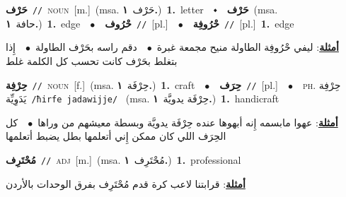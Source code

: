 \documentclass[10pt,a4paper,twoside]{article} %
\begin{document}
\begin{multicols}{2}
{\setlength\topsep{0pt}\textbf{\foreignlanguage{arabic}{حَرْف}}\ {\color{gray}\texttt{//}\color{black}}\ \textsc{noun}\ [m.]\ \color{gray}(msa. \foreignlanguage{arabic}{حَرْف}~\foreignlanguage{arabic}{\textbf{١.}})\color{black}\ \textbf{1.}~letter\ \ $\smblkdiamond$\ \ \setlength\topsep{0pt}\textbf{\foreignlanguage{arabic}{حَرْف}}\ \color{gray}(msa. \foreignlanguage{arabic}{حافة}~\foreignlanguage{arabic}{\textbf{١.}})\color{black}\ \textbf{1.}~edge\ \ $\bullet$\ \ \setlength\topsep{0pt}\textbf{\foreignlanguage{arabic}{حْرُوف}}\ {\color{gray}\texttt{//}\color{black}}\ [pl.]\ \ $\bullet$\ \ \setlength\topsep{0pt}\textbf{\foreignlanguage{arabic}{حْرُوفِة}}\ {\color{gray}\texttt{//}\color{black}}\ [pl.]\ \textbf{1.}~edge\  \begin{flushright}\color{gray}\foreignlanguage{arabic}{\textbf{\underline{\foreignlanguage{arabic}{أمثلة}}}: ليفي حْرُوفِة الطاولة منيح مجمعة غبرة\ $\bullet$\ \  دقم راسه بحَرْف الطاولة\ $\bullet$\ \  إِذا بتغلط بحَرْف كانت تحسب كل الكلمة غلط}\end{flushright}\color{black}} \vspace{2mm}

{\setlength\topsep{0pt}\textbf{\foreignlanguage{arabic}{حِرْفِة}}\ {\color{gray}\texttt{//}\color{black}}\ \textsc{noun}\ [f.]\ \color{gray}(msa. \foreignlanguage{arabic}{حِرْفَة}~\foreignlanguage{arabic}{\textbf{١.}})\color{black}\ \textbf{1.}~craft\ \ $\bullet$\ \ \setlength\topsep{0pt}\textbf{\foreignlanguage{arabic}{حِرَف}}\ {\color{gray}\texttt{//}\color{black}}\ [pl.]\ \ $\bullet$\ \ \textsc{ph.} \color{gray} \foreignlanguage{arabic}{حِرْفِة يَدَوِيِّة}\color{black}\ {\color{gray}\texttt{/{\sffamily ħirfe jadawijje}/}\color{black}}\ \color{gray} (msa. \foreignlanguage{arabic}{حِرْفَة يدويَّة}~\foreignlanguage{arabic}{\textbf{١.}})\color{black}\ \textbf{1.}~handicraft\  \begin{flushright}\color{gray}\foreignlanguage{arabic}{\textbf{\underline{\foreignlanguage{arabic}{أمثلة}}}: عهوا مابسمه إِنه أبهوها عنده حِرْفَة يدويَّة وبسطة معيشهم من وراها\ $\bullet$\ \  كل الحِرَف اللي كان ممكن إِني أتعلمها بطل يضبط أتعلمها}\end{flushright}\color{black}} \vspace{2mm}

{\setlength\topsep{0pt}\textbf{\foreignlanguage{arabic}{مُحْتَرِف}}\ {\color{gray}\texttt{//}\color{black}}\ \textsc{adj}\ [m.]\ \color{gray}(msa. \foreignlanguage{arabic}{مُحْتَرِف}~\foreignlanguage{arabic}{\textbf{١.}})\color{black}\ \textbf{1.}~professional\  \begin{flushright}\color{gray}\foreignlanguage{arabic}{\textbf{\underline{\foreignlanguage{arabic}{أمثلة}}}: قرابتنا لاعب كرة قدم مُحْتَرِف بفرق الوحدات بالأردن}\end{flushright}\color{black}} \vspace{2mm}


\end{multicols}
\end{document}
